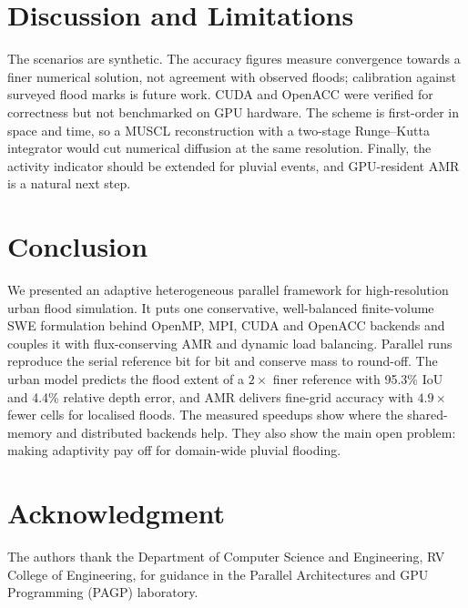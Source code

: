 \documentclass[conference]{IEEEtran}
\begin{document}
\section{Discussion and Limitations}
The scenarios are synthetic. The accuracy figures measure convergence towards
a finer numerical solution, not agreement with observed floods; calibration
against surveyed flood marks is future work. CUDA and OpenACC were verified
for correctness but not benchmarked on GPU hardware. The scheme is
first-order in space and time, so a MUSCL reconstruction with a two-stage
Runge--Kutta integrator would cut numerical diffusion at the same resolution.
Finally, the activity indicator should be extended for pluvial events, and
GPU-resident AMR is a natural next step.

\section{Conclusion}
We presented an adaptive heterogeneous parallel framework for high-resolution
urban flood simulation. It puts one conservative, well-balanced
finite-volume SWE formulation behind OpenMP, MPI, CUDA and OpenACC backends
and couples it with flux-conserving AMR and dynamic load balancing.
Parallel runs reproduce the serial reference bit for bit and conserve mass to
round-off. The urban model predicts the flood extent of a $2\times$ finer
reference with 95.3\% IoU and 4.4\% relative depth error, and AMR delivers
fine-grid accuracy with $4.9\times$ fewer cells for localised floods. The
measured speedups show where the shared-memory and distributed backends help.
They also show the main open problem: making adaptivity pay off for
domain-wide pluvial flooding.

\section*{Acknowledgment}
The authors thank the Department of Computer Science and Engineering, RV
College of Engineering, for guidance in the Parallel Architectures and GPU
Programming (PAGP) laboratory.
\end{document}
